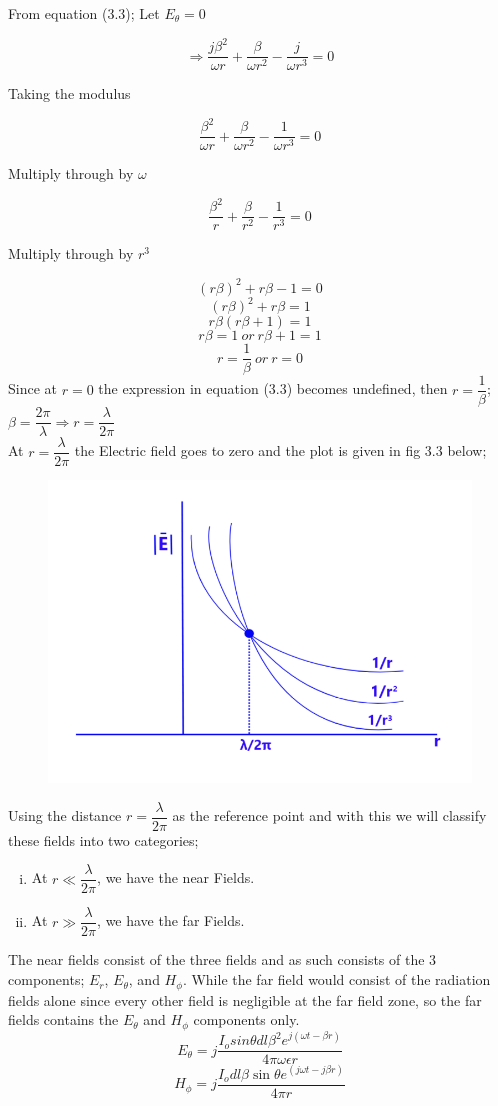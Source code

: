 From equation (3.3); Let $E_{\theta} = 0$

$$\Longrightarrow  \dfrac{j\beta^2}{\omega r} + \dfrac{\beta}{\omega r^2} - \dfrac{j}{\omega r^3} = 0 $$
\begin{center}
Taking the modulus
\end{center} 
$$  \dfrac{\beta^2}{\omega r} + \dfrac{\beta}{\omega r^2} - \dfrac{1}{\omega r^3} = 0 $$
\begin{center}
Multiply through by $\omega$
\end{center}
$$  \dfrac{\beta^2}{r} + \dfrac{\beta}{r^2} - \dfrac{1}{r^3} = 0 $$
\begin{center}
Multiply through by $r^3$
\end{center} 
$$  (r\beta)^2 + r\beta - 1 = 0 $$
$$  (r\beta)^2 + r\beta = 1 $$
$$  r\beta(r\beta + 1) = 1 $$
$$ r\beta = 1 \ or \ r\beta + 1 = 1 $$
$$ r = \dfrac{1}{\beta} \ or \ r = 0 $$
Since at $ r = 0$ the expression in equation (3.3) becomes undefined, then $ r = \dfrac{1}{\beta} $; $\beta = \dfrac{2\pi}{\lambda} \Longrightarrow r =  \dfrac{\lambda}{2 \pi} $ \\ 
At $ r =  \dfrac{\lambda}{2 \pi} $ the Electric field goes to zero and the plot is given in fig 3.3 below;
\begin{figure}[h]
\centering
\includegraphics[width=1\linewidth]{./graphics/fig1_3}
\caption{}
\label{fig:1}
\end{figure}
Using the distance $r =  \dfrac{\lambda}{2 \pi}$ as the reference point and with this we will classify these fields into two categories;
\begin{enumerate}[(i)]
\item At $r \ll  \dfrac{\lambda}{2 \pi}$, we have the near Fields.
\item At $r \gg  \dfrac{\lambda}{2 \pi}$, we have the far Fields.
\end{enumerate}
The near fields consist of the three fields and as such consists of the $3$ components; $E_r$, $E_{\theta}$, and $H_{\phi}$. While the far field would consist of the radiation fields alone since every other field is negligible at the far field zone, so the far fields contains the $E_\theta$ and $H_\phi$ components only. 
$$E_{\theta} = j\dfrac{I_osin \theta dl\beta^2 e^{j(\omega t - \beta r)}}{4\pi \omega \epsilon r}$$
$$H_\phi = j\dfrac{I_o dl \beta \sin\theta   e^{(j\omega t-j\beta r)} }{4\pi r} $$

